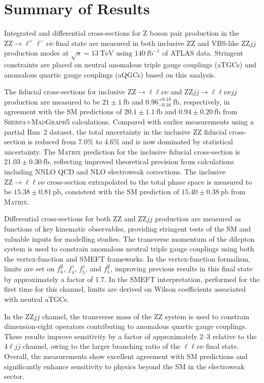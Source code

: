 \section{Summary of Results}

Integrated and differential cross-sections for $\text{Z}$ boson pair production in the 
$\text{ZZ} \to \ell^+\ell^- \nu\bar{\nu}$ final state are measured in both inclusive $\text{ZZ}$ and VBS-like $\text{ZZ}jj$ production modes at $\sqrt{s}=13~\text{TeV}$ using $140~\text{fb}^{-1}$ of ATLAS data. Stringent constraints are placed on neutral anomalous triple gauge couplings (aTGCs) and anomalous quartic gauge couplings (aQGCs) based on this analysis. 

The fiducial cross-sections for inclusive $\text{ZZ} \to \ell\ell\nu\nu$ and $\text{ZZ}jj \to \ell\ell\nu\nu jj$ production are measured to be $21 \pm 1~\text{fb}$ and $0.96^{+0.18}_{-0.16}~\text{fb}$, respectively, in agreement with the SM predictions of $20.1 \pm 1.1~\text{fb}$ and $0.94 \pm 0.20~\text{fb}$ from \textsc{Sherpa}+\textsc{MadGraph5} calculations. Compared with earlier measurements using a partial Run~2 dataset, the total uncertainty in the inclusive $\text{ZZ}$ fiducial cross-section is reduced from 7.0\% to 4.6\% and is now dominated by statistical uncertainty. The \textsc{Matrix} prediction for the inclusive fiducial cross-section is $21.03 \pm 0.30~\text{fb}$, reflecting improved theoretical precision from calculations including NNLO QCD and NLO electroweak corrections. The inclusive $\text{ZZ} \to \ell\ell\nu\nu$ cross-section extrapolated to the total phase space is measured to be $15.38 \pm 0.81~\text{pb}$, consistent with the SM prediction of $15.40 \pm 0.38~\text{pb}$ from \textsc{Matrix}.

Differential cross-sections for both $\text{ZZ}$ and $\text{ZZ}jj$ production are measured as functions of key kinematic observables, providing stringent tests of the SM and valuable inputs for modelling studies. The transverse momentum of the dilepton system is used to constrain anomalous neutral triple gauge couplings using both the vertex-function and SMEFT frameworks. In the vertex-function formalism, limits are set on $f_{4}^{\text{Z}}$, $f_{4}^{\gamma}$, $f_{5}^{\gamma}$, and $f_{5}^{\text{Z}}$, improving previous results in this final state by approximately a factor of 1.7. In the SMEFT interpretation, performed for the first time for this channel, limits are derived on Wilson coefficients associated with neutral aTGCs.

In the $\text{ZZ}jj$ channel, the transverse mass of the $\text{ZZ}$ system is used to constrain dimension-eight operators contributing to anomalous quartic gauge couplings. These results improve sensitivity by a factor of approximately 2--3 relative to the $4\ell jj$ channel, owing to the larger branching ratio of the $\ell\ell\nu\nu$ final state. Overall, the measurements show excellent agreement with SM predictions and significantly enhance sensitivity to physics beyond the SM in the electroweak sector.

